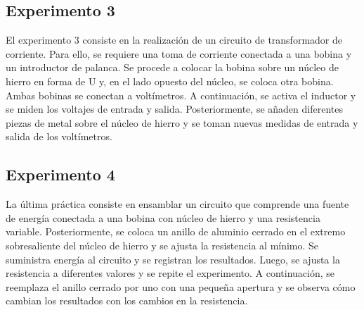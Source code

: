 \documentclass[twocolumn, 12pt]{article}
\begin{document}
\subsection*{Experimento 3}

El experimento 3 consiste en la realización de un circuito
de transformador de corriente. Para ello, se requiere una
toma de corriente conectada a una bobina y un introductor
de palanca. Se procede a colocar la bobina sobre un núcleo
de hierro en forma de U y, en el lado opuesto del núcleo,
se coloca otra bobina. Ambas bobinas se conectan a
voltímetros. A continuación, se activa el inductor y se
miden los voltajes de entrada y salida. Posteriormente, se
añaden diferentes piezas de metal sobre el núcleo de hierro
y se toman nuevas medidas de entrada y salida de los
voltímetros.

\subsection*{Experimento 4}

La última práctica consiste en ensamblar un circuito que
comprende una fuente de energía conectada a una bobina con
núcleo de hierro y una resistencia variable.
Posteriormente, se coloca un anillo de aluminio cerrado en
el extremo sobresaliente del núcleo de hierro y se ajusta
la resistencia al mínimo. Se suministra energía al circuito
y se registran los resultados. Luego, se ajusta la
resistencia a diferentes valores y se repite el
experimento. A continuación, se reemplaza el anillo cerrado
por uno con una pequeña apertura y se observa cómo cambian
los resultados con los cambios en la resistencia.

\newpage

\printbibliography
\end{document}
